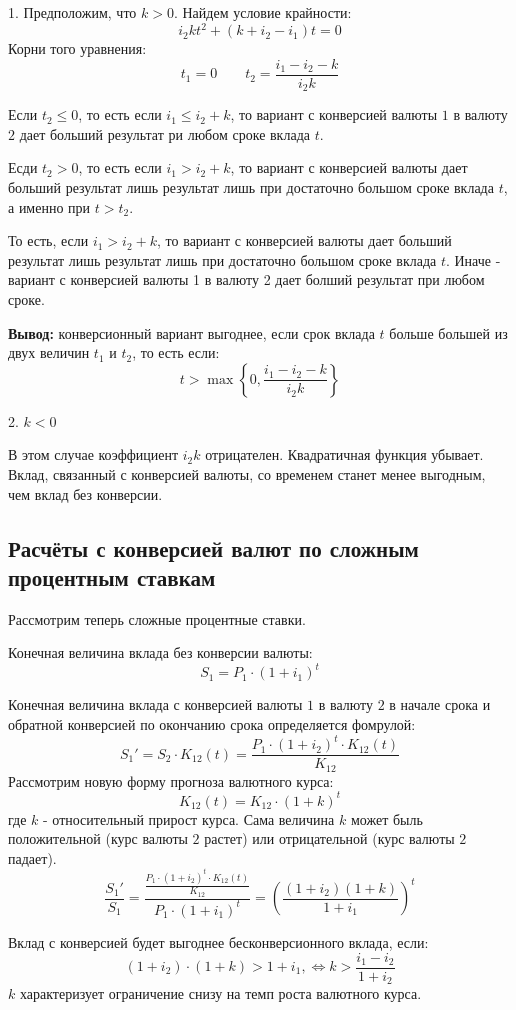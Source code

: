 \documentclass[aps,%
12pt,%
final,%
oneside,
onecolumn,%
musixtex, %
superscriptaddress,%
centertags]{article} %
\theoremstyle{plain}
\theoremstyle{definition}
\theoremstyle{remark}
\begin{document}
1. Предположим, что $k >0$. Найдем условие крайности:
$$i_2kt^2 + (k+i_2-i_1)t = 0$$
Корни того уравнения:
$$t_1=0 \qquad t_2=\frac{i_1-i_2-k}{i_2k}$$

Если $t_2 \leq 0$, то есть если $i_1 \leq i_2+k$, то вариант с конверсией валюты $1$ в валюту $2$ дает больший результат ри любом сроке вклада $t$.

Есди $t_2 >0$, то есть если $i_1 >i_2+k$, то вариант с конверсией валюты дает больший результат лишь результат лишь при достаточно большом сроке вклада $t$, а именно при $t > t_2$.

То есть, если $i_1 >i_2+k$, то вариант с конверсией валюты дает больший результат лишь результат лишь при достаточно большом сроке вклада $t$. Иначе - вариант с конверсией валюты 1 в валюту 2 дает болший результат при любом сроке.

\textbf{Вывод:} конверсионный вариант выгоднее, если срок вклада $t$ больше большей из двух величин $t_1$ и $t_2$, то есть если:
$$t > \max\left\{0,\frac{i_1-i_2-k}{i_2k}\right\}$$

2. $k < 0$

В этом случае коэффициент $i_2k$ отрицателен. Квадратичная функция убывает. Вклад, связанный с конверсией валюты, со временем станет менее выгодным, чем вклад без конверсии.


\subsection{Расчёты с конверсией валют по сложным процентным ставкам }

Рассмотрим теперь сложные процентные ставки.

Конечная величина вклада без конверсии валюты:
$$S_1 = P_1 \cdot (1+i_1)^t$$

Конечная величина вклада с конверсией валюты $1$ в валюту $2$ в начале срока и обратной конверсией по окончанию срока определяется фомрулой:
$$S_1' = S_2 \cdot K_{12}(t) = \frac{P_1 \cdot (1+i_2)^t \cdot K_{12}(t)}{K_{12}}$$
Рассмотрим новую форму прогноза валютного курса:
$$K_{12}(t) = K_{12} \cdot (1+k)^t$$
где $k$ - относительный прирост курса. Сама величина $k$ может быль положительной (курс валюты $2$ растет) или отрицательной (курс валюты $2$ падает).
$$\frac{S_1'}{S_1} = \frac{\frac{P_1 \cdot (1+i_2)^t \cdot K_{12}(t)}{K_{12}}}{P_1 \cdot (1+i_1)^t} = \left(\frac{(1+i_2)(1+k)}{1+i_1}\right)^t$$

Вклад с конверсией будет выгоднее бесконверсионного вклада, если:
$$(1+i_2) \cdot (1+k) > 1+i_1, \Leftrightarrow k > \frac{i_1-i_2}{1+i_2}$$
$k$ характеризует ограничение снизу на темп роста валютного курса.
\end{document}
